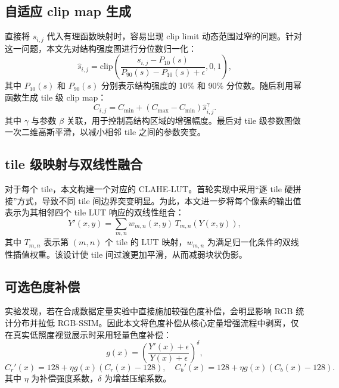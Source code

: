 \subsection{自适应 clip map 生成}
直接将 $s_{i,j}$ 代入有理函数映射时，容易出现 clip limit 动态范围过窄的问题。针对这一问题，本文先对结构强度图进行分位数归一化：
\begin{equation}
\hat{s}_{i,j} = \mathrm{clip}\left(\frac{s_{i,j}-P_{10}(s)}{P_{90}(s)-P_{10}(s)+\epsilon}, 0, 1\right),
\end{equation}
其中 $P_{10}(s)$ 和 $P_{90}(s)$ 分别表示结构强度的 10\% 和 90\% 分位数。随后利用幂函数生成 tile 级 clip map：
\begin{equation}
C_{i,j}=C_{\min}+(C_{\max}-C_{\min})\hat{s}_{i,j}^{\gamma}.
\end{equation}
其中 $\gamma$ 与参数 $\beta$ 关联，用于控制高结构区域的增强幅度。最后对 tile 级参数图做一次二维高斯平滑，以减小相邻 tile 之间的参数突变。

\subsection{tile 级映射与双线性融合}
对于每个 tile，本文构建一个对应的 CLAHE-LUT。首轮实现中采用“逐 tile 硬拼接”方式，导致不同 tile 间边界突变明显。为此，本文进一步将每个像素的输出值表示为其相邻四个 tile LUT 响应的双线性组合：
\begin{equation}
Y'(x,y)=\sum_{m,n} w_{m,n}(x,y)\,T_{m,n}(Y(x,y)),
\end{equation}
其中 $T_{m,n}$ 表示第 $(m,n)$ 个 tile 的 LUT 映射，$w_{m,n}$ 为满足归一化条件的双线性插值权重。该设计使 tile 间过渡更加平滑，从而减弱块状伪影。

\subsection{可选色度补偿}
实验发现，若在合成数据定量实验中直接施加较强色度补偿，会明显影响 RGB 统计分布并拉低 RGB-SSIM。因此本文将色度补偿从核心定量增强流程中剥离，仅在真实低照度视觉展示时采用轻量色度补偿：
\begin{equation}
g(x)=\left(\frac{Y'(x)+\epsilon}{Y(x)+\epsilon}\right)^{\delta},
\end{equation}
\begin{equation}
C_r'(x)=128+\eta g(x)(C_r(x)-128),\quad
C_b'(x)=128+\eta g(x)(C_b(x)-128).
\end{equation}
其中 $\eta$ 为补偿强度系数，$\delta$ 为增益压缩系数。
